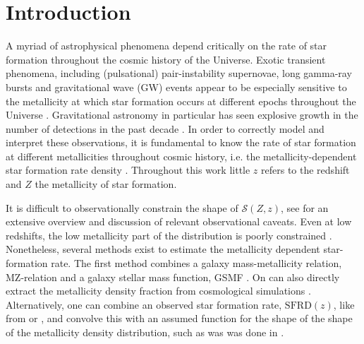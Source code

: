 \documentclass[twocolumn]{aastex631}
\newcommand{\SFRDzZ}{\ensuremath{\mathcal{S}(Z,z)}\xspace}
\newcommand{\SFRDz}{\ensuremath{\mathrm{SFRD}(z)}\xspace}
\begin{document}


\section{Introduction \label{sec: intro}}
A myriad of astrophysical phenomena depend critically on the rate of star formation throughout the cosmic history of the Universe. Exotic transient phenomena, including (pulsational) pair-instability supernovae, long gamma-ray bursts and gravitational wave (GW) events appear to be especially sensitive to the metallicity at which star formation occurs at different epochs throughout the Universe \citep[e.g.,][]{Langer+2007,Fruchter+2006,LIGO2016_implications}.
Gravitational astronomy in particular has seen explosive growth in the number of detections in the past decade \citep[][]{GWTC1,GWTC2,GWTC3}. In order to correctly model and interpret these observations, it is fundamental to know the rate of star formation at different metallicities throughout cosmic history, i.e. the metallicity-dependent star formation rate density  \citep[\SFRDzZ, see also the recent review by][]{chruslinska2022_review}. Throughout this work little $z$ refers to the redshift and $Z$ the metallicity of star formation. 


It is difficult to observationally constrain the shape of \SFRDzZ, see \cite{Chruslinska2019_obs} for an extensive overview and discussion of relevant observational caveats. Even at low redshifts, the low metallicity part of the distribution is poorly constrained \citep{Chruslinska+2021}.
Nonetheless, several methods exist to estimate the metallicity dependent star-formation rate. The first method combines a galaxy mass-metallicity relation, MZ-relation and a galaxy stellar mass function, GSMF \citep[see e.g.][]{Dominik+2013}.
On can also directly extract the metallicity density fraction from cosmological simulations \citep[e.g.][]{Mapelli2017, Briel+2021}.
Alternatively, one can combine an observed star formation rate, \SFRDz, like from \cite{MadauDickinson2014} or \cite{Madau+2017}, and convolve this with an assumed function for the shape of the shape of the metallicity density distribution, such as was was done in \cite{LangerNorman, Neijssel+2019}.
\end{document}
